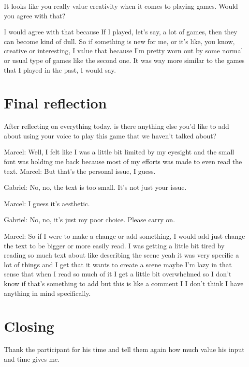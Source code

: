 \begin{QandA}
   \item It looks like you really value creativity when it comes to playing games. Would you agree with that?
   \begin{answered}
      I would agree with that because
      If I played, let's say, a lot of games, then they can become kind of dull.
      So if something is new for me, or it's like, you know, creative or interesting,
      I value that because I'm pretty worn out by some normal or usual type of games like the second one.
      It was way more similar to the games that I played in the past, I would say.
   \end{answered}
\end{QandA}


\section{Final reflection}

\begin{QandA}
   \item After reflecting on everything today, is there anything else you’d like to add about using your voice to play this game that we haven't talked about?

         \begin{answered}
            Marcel: Well, I felt like I was a little bit limited by my eyesight and the small font was holding me back because most of my efforts was made to even read the text.
            Marcel: But that's the personal issue, I guess.


            Gabriel: No, no, the text is too small.  It's not just your issue.


            Marcel: I guess it's aesthetic.

            Gabriel: No, no, it's just my poor choice. Please carry on.


            Marcel: So if I were to make a change or add something, I would add
            just change the text to be bigger or more easily read.
            I was getting a little bit tired by reading so much text about like
            describing the scene yeah it was very specific a lot of things and I get that it wants to create a scene maybe I'm lazy in that sense that when I read so much of it I get a little bit overwhelmed so I don't know if that's something to add but this is like a comment I
            I don't think I have anything in mind specifically.
         \end{answered}
\end{QandA}

\section{Closing}
Thank the participant for his time and tell them again how much value his input and time gives me.






